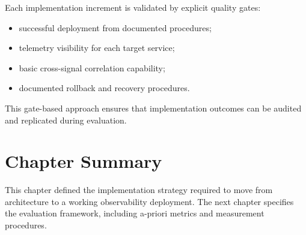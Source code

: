 Each implementation increment is validated by explicit quality gates:
\begin{itemize}
    \item successful deployment from documented procedures;
    \item telemetry visibility for each target service;
    \item basic cross-signal correlation capability;
    \item documented rollback and recovery procedures.
\end{itemize}

This gate-based approach ensures that implementation outcomes can be audited and replicated during evaluation.

\section{Chapter Summary}

This chapter defined the implementation strategy required to move from architecture to a working observability deployment. The next chapter specifies the evaluation framework, including a-priori metrics and measurement procedures.
